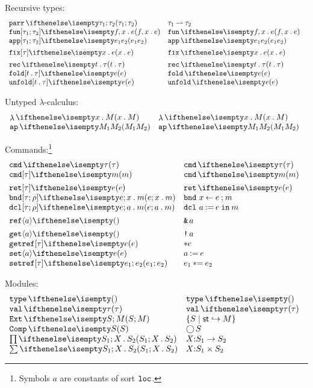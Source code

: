 \documentclass[11pt,twoside]{article}
\begin{document}
Recursive types:
\begin{displaymath}
  \begin{array}{l@{\quad}l@{\quad}l}

    \parrty{\tau_1}{\tau_2} & \parrty*{\tau_1}{\tau_2} \\
    \funex{f}{x}{e} & \funex*{f}{x}{e} \\
    \pappex{e_1}{e_2} & \pappex*{e_1}{e_2} \\[1ex]

    \fixex[\tau]{x}{e} & \fixex*[\tau]{x}{e}  \\[1ex]

    \recty{t}{\tau} & \recty*{t}{\tau} \\
    \foldex[t][\tau]{e}  & \foldex*{e} \\
    \unfoldex[t][\tau]{e} & \unfoldex*{e}
  \end{array}
\end{displaymath}

Untyped $\lambda$-calculus:
\begin{displaymath}
  \begin{array}{l@{\quad}l@{\quad}l}
    \ulamex{x}{M} & \ulamex*{x}{M} \\
    \uapex{M_1}{M_2} & \uapex*{M_1}{M_2}
  \end{array}
\end{displaymath}

Commands:\footnote{Symbols $a$ are constants of sort $\texttt{loc}$.}
\begin{displaymath}
  \begin{array}{l@{\quad}l@{\quad}l}
    \cmdty{\tau}  & \cmdty*{\tau} \\
    \cmdex[\tau]{m} & \cmdex*{m} \\[1ex]
    \retcmd[\tau]{e} & \retcmd*{e} \\
    \bndcmd{e}{x}{m} & \bndcmd*{e}{x}{m} \\
    \dclcmd{e}{a}{m} & \dclcmd*{e}{a}{m} \\[1ex]
    \refex{a} & \refex*{a} \\[1ex]
    \getcmd{a} & \getcmd*{a} \\
    \getrefcmd[\tau]{e} & \getrefcmd*{e} \\
    \setcmd{a}{e} & \setcmd*{a}{e} \\
    \setrefcmd[\tau]{e_1}{e_2} & \setrefcmd*[\tau]{e_1}{e_2} 
 \end{array}
\end{displaymath}

Modules:
\begin{displaymath}
  \begin{array}{l@{\quad}l@{\quad}l}
    \univsg  & \univsg* \\
    \valmod{\tau} & \valmod*{\tau} \\
    \extsg{S}{M} & \extsg*{S}{M} \\
    \compsg{S}  & \compsg*{S} \\
    \pisg{S_1}{X}{S_2} & \pisg*{S_1}{X}{S_2} \\
    \sigsg{S_1}{X}{S_2} & \sigsg*{S_1}{X}{S_2}
  \end{array}
\end{displaymath}
\end{document}
